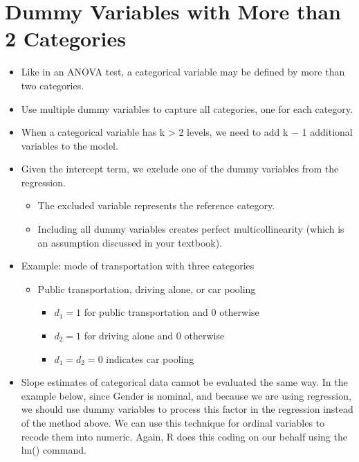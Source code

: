 \documentclass[
  letterpaper,
  DIV=11,
  numbers=noendperiod]{scrreprt}
\providecommand{\tightlist}{%
  \setlength{\itemsep}{0pt}\setlength{\parskip}{0pt}}\usepackage{longtable,booktabs,array}
\begin{document}
\section{Dummy Variables with More than 2
Categories}\label{dummy-variables-with-more-than-2-categories}

\begin{itemize}
\tightlist
\item
  Like in an ANOVA test, a categorical variable may be defined by more
  than two categories.
\item
  Use multiple dummy variables to capture all categories, one for each
  category.
\item
  When a categorical variable has k \textgreater{} 2 levels, we need to
  add k − 1 additional variables to the model.
\item
  Given the intercept term, we exclude one of the dummy variables from
  the regression.

  \begin{itemize}
  \tightlist
  \item
    The excluded variable represents the reference category.
  \item
    Including all dummy variables creates perfect multicollinearity
    (which is an assumption discussed in your textbook).
  \end{itemize}
\item
  Example: mode of transportation with three categories

  \begin{itemize}
  \tightlist
  \item
    Public transportation, driving alone, or car pooling

    \begin{itemize}
    \tightlist
    \item
      \(d_1=1\) for public transportation and 0 otherwise
    \item
      \(d_2=1\) for driving alone and 0 otherwise
    \item
      \(d_1=d_2=0\) indicates car pooling
    \end{itemize}
  \end{itemize}
\item
  Slope estimates of categorical data cannot be evaluated the same way.
  In the example below, since Gender is nominal, and because we are
  using regression, we should use dummy variables to process this factor
  in the regression instead of the method above. We can use this
  technique for ordinal variables to recode them into numeric. Again, R
  does this coding on our behalf using the lm() command.
\end{itemize}
\end{document}
